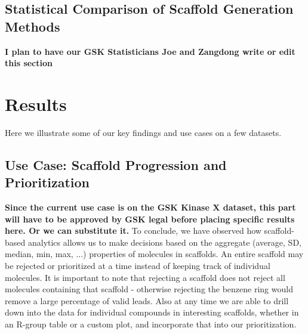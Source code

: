 \documentclass[journal=jacsat,manuscript=article]{achemso}
\begin{document}
\subsection{Statistical Comparison of Scaffold Generation Methods}
\label{sec:statmethod}
\textbf{I plan to have our GSK Statisticians Joe and Zangdong write or edit this section}

\section{Results}
\label{sec:results}
Here we illustrate some of our key findings and use cases on a few datasets. 

\subsection{Use Case: Scaffold Progression and Prioritization}
\textbf{Since the current use case is on the GSK Kinase X dataset, this part will have to be approved by GSK legal before placing specific results here. Or we can substitute it.}
To conclude, we have observed how scaffold-based analytics allows us to make decisions based on the aggregate (average, SD, median, min, max, ...) properties of molecules in scaffolds. An entire scaffold may be rejected or prioritized at a time instead of keeping track of individual molecules. It is important to note that rejecting a scaffold does not reject all molecules containing that scaffold - otherwise rejecting the benzene ring would remove a large percentage of valid leads. Also at any time we are able to drill down into the data for individual compounds in interesting scaffolds, whether in an R-group table or a custom plot, and incorporate that into our prioritization.   
\end{document}
